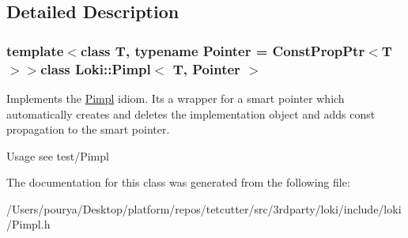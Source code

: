 \subsection{Detailed Description}
\subsubsection*{template$<$class T, typename Pointer = Const\+Prop\+Ptr$<$\+T$>$$>$class Loki\+::\+Pimpl$<$ T, Pointer $>$}

Implements the \hyperlink{classLoki_1_1Pimpl}{Pimpl} idiom. It\textquotesingle{}s a wrapper for a smart pointer which automatically creates and deletes the implementation object and adds const propagation to the smart pointer.

\begin{DoxyParagraph}{Usage}
see test/\+Pimpl 
\end{DoxyParagraph}


The documentation for this class was generated from the following file\+:\begin{DoxyCompactItemize}
\item 
/\+Users/pourya/\+Desktop/platform/repos/tetcutter/src/3rdparty/loki/include/loki/Pimpl.\+h\end{DoxyCompactItemize}
